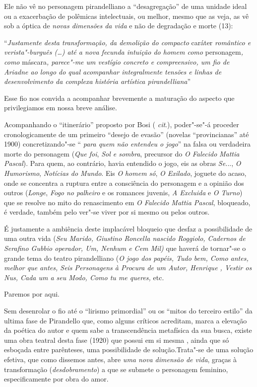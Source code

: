 Ele não vê no personagem pirandelliano a ``desagregação'' de uma unidade
ideal ou a exacerbação de polêmicas intelectuais, ou melhor, mesmo que
as veja, as vê sob a óptica de \emph{novas dimensões da vida} e não de
degradação e morte (13):

``\emph{Justamente desta transformação, da demolição do compacto}
caráter \emph{romântico e verista"-burguês (\ldots{}) até a nova fecunda
intuição do homem como} personagem\emph{, como} máscara\emph{, parece"-me
um vestígio concreto e compreensivo, um fio de Ariadne ao longo do qual
acompanhar integralmente tensões e linhas de desenvolvimento da complexa
história artística pirandelliana}''

Esse fio nos convida a acompanhar brevemente a maturação do aspecto que
privilegiamos em nossa breve análise.

Acompanhando o ``itinerário'' proposto por Bosi ( \emph{cit}.),
poder"-se"-á proceder cronologicamente de um primeiro ``desejo de evasão''
(novelas ``provincianas'' até 1900) concretizando"-se `` \emph{para quem
não entendeu o jogo}'' na falsa ou verdadeira morte do personagem
(\emph{Que foi}, \emph{Sol e sombra}, precursor do \emph{O Falecido}
\emph{Mattia Pascal}). Para quem, ao contrário, havia entendido o jogo,
eis as obras \emph{Se.}.., \emph{O Humorismo}, \emph{Notícias do Mundo}.
Eis \emph{O} \emph{homem só}, \emph{O Exilado}, joguete do acaso, onde
se concentra a ruptura entre a consciência do personagem e a opinião dos
outros (\emph{Longe}, \emph{Fogo no palheiro} e os romances juvenis,
\emph{A Excluida} e \emph{O Turno}) que se resolve no mito do
renascimento em \emph{O Falecido Mattia Pascal}, bloqueado, é verdade,
também pelo ver"-se viver por si mesmo ou pelos outros.

É justamente a ambiência deste implacável bloqueio que desfaz a
possibilidade de uma outra vida (\emph{Seu Marido, Giustino Roncella
nascido Roggiolo, Cadernos de Serafino Gubbio operador, Um, Nenhum e Cem
Mil)} que haverá de tornar"-se o grande tema do teatro pirandelliano
(\emph{O jogo dos papéis, Tudo bem, Como antes, melhor que antes, Seis
Personagens à Procura de um Autor, Henrique , Vestir os Nus, Cada um a
seu Modo, Como tu me queres,} etc.

Paremos por aqui.

Sem desenrolar o fio até o ``lirismo primordial'' ou os ``mitos do
terceiro estilo'' da ultima fase de Pirandello que, como alguns críticos
acreditam, marca a elevação da poética do autor e quem sabe a
transcendência metafísica da sua busca, existe uma obra teatral desta
fase (1920) que possui em si mesma , ainda que só esboçada entre
parênteses, uma possibilidade de solução.Trata"-se de uma solução
efetiva, que como dissemos antes, abre \emph{uma nova dimensão de vida},
graças à transformação (\emph{desdobramento}) a que se submete o
personagem feminino, especificamente por obra do amor.

